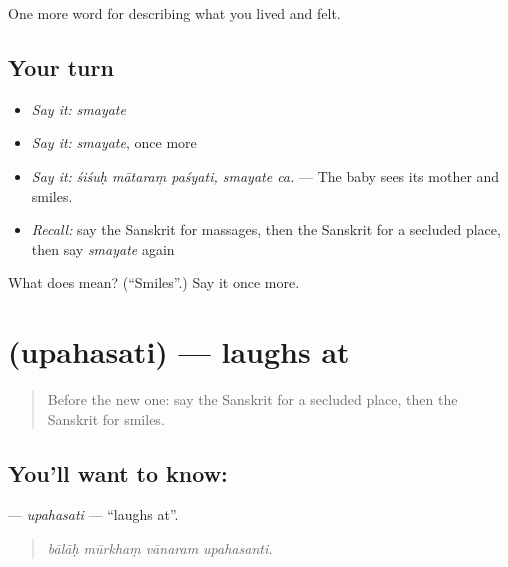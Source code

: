 \begin{grammarlens}[title={What you've built}]
One more word for describing what you lived and felt.
\end{grammarlens}

\subsection*{Your turn}
\begin{itemize}
\raggedright
  \item \emph{Say it:} \emph{smayate}
  \item \emph{Say it:} \emph{smayate}, once more
  \item \emph{Say it:} \emph{śiśuḥ mātaraṃ paśyati, smayate ca.} — The baby sees its mother and smiles.
  \item \emph{Recall:} say the Sanskrit for massages, then the Sanskrit for a secluded place, then say \emph{smayate} again
\end{itemize}

\begin{tcolorbox}[breakable,colback=teal!4,colframe=teal!35!black,title={Before you move on}]
What does  mean? (\textquotedblleft{}Smiles\textquotedblright{}.) Say it once more.
\end{tcolorbox}
\section[\texorpdfstring{\sk{उपहसति} (upahasati)}{उपहसति (upahasati)}]{ (upahasati) — laughs at}

\label{lesson:SA-C457-upahasati}



\begin{quote}
Before the new one: say the Sanskrit for a secluded place, then the Sanskrit for smiles.
\end{quote}

\subsection*{You'll want to know: }
\textbf{} — \emph{upahasati} — \textquotedblleft{}laughs at\textquotedblright{}.

\begin{quote}
   
\end{quote}

\begin{quote}
\emph{bālāḥ mūrkhaṃ vānaram upahasanti.}
\end{quote}

